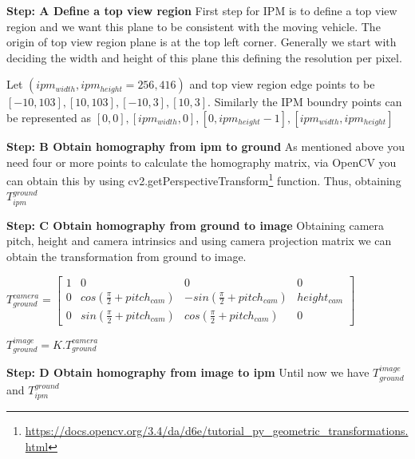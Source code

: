      \textbf{Step: A Define a top view region \newline} 
     First step for IPM is to define a top view region and we want this plane to be consistent with the moving vehicle. The origin of top view region plane is at the top left corner. Generally we start with deciding the width and height of this plane this defining the resolution per pixel. 
     
     Let $(ipm_{width}, ipm_{height} = 256, 416)$ and top view region edge points to be $[-10, 103], [10, 103], [-10, 3], [10, 3]$. Similarly the IPM boundry points can be represented as $[0, 0],
                                                              [ipm_{width}, 0],
                                                              [0, ipm_{height}-1],
                                                              [ipm_{width}, ipm_{height}]$

     \textbf{Step: B Obtain homography from ipm to ground} \newline
     As mentioned above you need four or more points to calculate the homography matrix, via OpenCV you can obtain this by using cv2.getPerspectiveTransform\footnote{\url{https://docs.opencv.org/3.4/da/d6e/tutorial_py_geometric_transformations.html}} function. 
     Thus, obtaining $T^{ground}_{ipm}$
     
     \textbf{Step: C Obtain homography from ground to image} \newline
     Obtaining camera pitch, height and camera intrinsics and using camera projection matrix we can obtain the transformation from ground to image. 
     \begin{center}
     $T_{ground}^{camera } = \begin{bmatrix}1 & 0 & 0 & 0 \\0 & cos(\frac{\pi}{2} + pitch_{cam}) & -sin(\frac{\pi}{2} + pitch_{cam}) & height_{cam} \\ 0 &sin(\frac{\pi}{2} + pitch_{cam}) &cos(\frac{\pi}{2} + pitch_{cam}) & 0   \end{bmatrix}$
     \end{center}
     
     \begin{center}
     $T_{ground}^{image} = K . T_{ground}^{camera }$
    \end{center}
    
    
     \textbf{Step: D Obtain homography from image to ipm} \newline
    Until now we have $T^{image}_{ground}$ and $T^{ground}_{ipm}$
    
